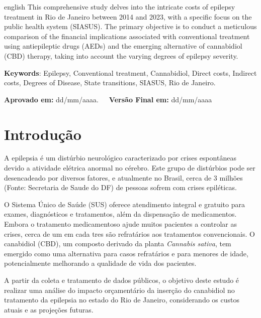 \documentclass[article,a4paper,12pt,brazil,sumario=tradicional]{abntex2}
\begin{document}
\vspace{-.3cm}
\begin{hyphenrules}{english}
\noindent This comprehensive study delves into the intricate costs of epilepsy treatment in Rio de Janeiro between 2014 and 2023, with a specific focus on the public health system (SIASUS). The primary objective is to conduct a meticulous comparison of the financial implications associated with conventional treatment using antiepileptic drugs (AEDs) and the emerging alternative of cannabidiol (CBD) therapy, taking into account the varying degrees of epilepsy severity.
\end{hyphenrules}
\vspace{.4cm}
 
\noindent \textbf{Keywords}: Epilepsy, Conventional treatment, Cannabidiol, Direct costs, Indirect costs, Degrees of Disease, State transitions, SIASUS, Rio de Janeiro.

\vspace{.4cm}

\noindent \textbf{Aprovado em:} dd/mm/aaaa.~~~\textbf{Versão Final em:} dd/mm/aaaa

\section{Introdução}

A epilepsia é um distúrbio neurológico caracterizado por crises espontâneas devido a atividade elétrica anormal no cérebro. Este grupo de distúrbios pode ser desencadeado por diversos fatores, e atualmente no Brasil, cerca de 3 milhões (Fonte: Secretaria de Saude do DF) de pessoas sofrem com crises epiléticas. 

O Sistema Único de Saúde (SUS) oferece atendimento integral e gratuito para exames, diagnósticos e tratamentos, além da dispensação de medicamentos. Embora o tratamento medicamentoso ajude muitos pacientes a controlar as crises, cerca de um em cada tres são refratários aos tratamentos convencionais. O canabidiol (CBD), um composto derivado da planta \textit{Cannabis sativa}, tem emergido como uma alternativa para casos refratários e para menores de idade, potencialmente melhorando a qualidade de vida dos pacientes.

A partir da coleta e tratamento de dados públicos, o objetivo deste estudo é realizar uma análise do impacto orçamentário da inserção do canabidiol no tratamento da epilepsia no estado do Rio de Janeiro, considerando os custos atuais e as projeções futuras.
\end{document}
